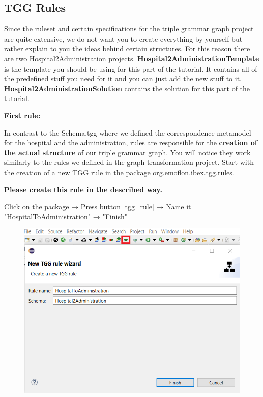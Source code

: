 \clearpage

\subsection{TGG Rules}

Since the ruleset and certain specifications for the triple grammar graph project are quite extensive, we do not want you to create everything by yourself but rather explain to you the ideas behind certain structures. For this reason there are two Hospital2Administration projects. \textbf{Hospital2AdministrationTemplate} is the template you should be using for this part of the tutorial. It contains all of the predefined stuff you need for it and you can just add the new stuff to it. \textbf{Hospital2AdministrationSolution} contains the solution for this part of the tutorial.\newline

\textbf{First rule:}

In contrast to the Schema.tgg where we defined the correspondence metamodel for the hospital and the administration, rules are responsible for the \textbf{creation of the actual structure} of our triple grammar graph. You will notice they work similarly to the rules we defined in the graph transformation project. Start with the creation of a new TGG rule in the package \textsf{org.emoflon.ibex.tgg.rules}.\newline

\textbf{Please create this rule in the described way.}\newline

\centering

Click on the package →  Press button \ref{tgg_rule} → Name it \textsf{"HospitalToAdministration"} → \textsf{"Finish"}\newline

\raggedright

\begin{figure}[h]
    \centering
    \includegraphics[scale=0.5 ]{pictures/tgg_rule_creation.png}
    \caption{}
    \label{TGG rule creation}
\end{figure}

